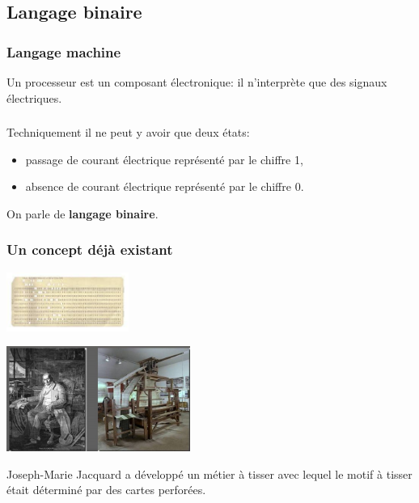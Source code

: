 \documentclass[svgnames,11pt]{beamer}
\begin{document}
\subsection{Langage binaire}
\begin{frame}
    \frametitle{Langage machine}

    \begin{aretenir}[]
        Un processeur est un composant électronique: il n'interprète que des signaux électriques.
    \end{aretenir}

\end{frame}
\begin{frame}
    \frametitle{}

    Techniquement il ne peut y avoir que deux états:
    \begin{itemize}
        \item passage de courant électrique représenté par le chiffre 1,
        \item absence de courant électrique représenté par le chiffre 0.
    \end{itemize}
    \begin{center}
        On parle de \textbf{langage binaire}.
    \end{center}
\end{frame}
\begin{frame}
    \frametitle{Un concept déjà existant}
    \begin{center}
        \includegraphics[width=4cm]{ressources/carte.jpg}

    \end{center}
    \begin{center}
        \centering
        \includegraphics[width=6cm]{ressources/jacquard.png}
    \end{center}
    \begin{aretenir}[1801]
        Joseph-Marie Jacquard a développé un métier à tisser avec lequel le motif à tisser était déterminé par des cartes perforées.
    \end{aretenir}
\end{frame}
\end{document}
